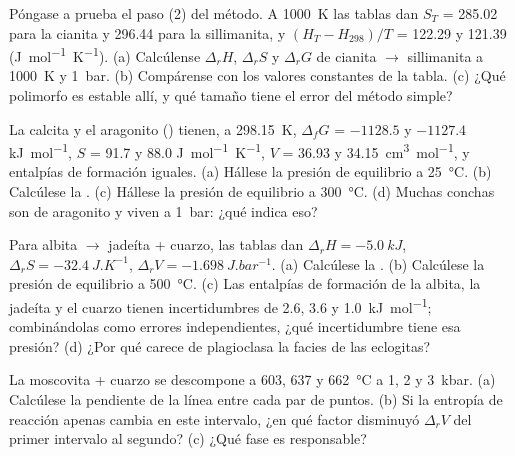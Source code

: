 \begin{exercise}[$\star\star$]\label{exo:b2:metamorphic-facies:6}
Póngase a prueba el paso (2) del método. A \qty{1000}{K} las tablas dan $S_T$ = 285.02 para la cianita
y 296.44 para la sillimanita, y $(H_T - H_{298})/T$ = 122.29 y 121.39
(\unit{J.mol^{-1}.K^{-1}}). (a) Calcúlense $\Delta_r H$, $\Delta_r S$ y $\Delta_r G$ de
cianita $\to$ sillimanita a \qty{1000}{K} y \qty{1}{bar}. (b) Compárense con los valores
constantes de la tabla. (c) ¿Qué polimorfo es estable allí, y qué tamaño tiene el error del
método simple?
\end{exercise}

\begin{exercise}[$\star\star$]\label{exo:b2:metamorphic-facies:7}
La calcita y el aragonito () tienen, a \qty{298.15}{K}, $\Delta_f G$ = $-1128.5$ y
$-1127.4$ \unit{kJ.mol^{-1}}, $S$ = 91.7 y 88.0 \unit{J.mol^{-1}.K^{-1}}, $V$ = 36.93
y \qty{34.15}{cm^3.mol^{-1}}, y entalpías de formación iguales. (a) Hállese la
presión de equilibrio a \qty{25}{\celsius}. (b) Calcúlese la . (c) Hállese la
presión de equilibrio a \qty{300}{\celsius}. (d) Muchas conchas son de aragonito y
viven a \qty{1}{bar}: ¿qué indica eso?
\end{exercise}

\begin{exercise}[$\star\star$]\label{exo:b2:metamorphic-facies:8}
Para albita $\to$ jadeíta + cuarzo, las tablas dan $\Delta_r H = \qty{-5.0}{kJ}$,
$\Delta_r S = \qty{-32.4}{J.K^{-1}}$, $\Delta_r V = \qty{-1.698}{J.bar^{-1}}$. (a)
Calcúlese la . (b) Calcúlese la presión de equilibrio a \qty{500}{\celsius}.
(c) Las entalpías de formación de la albita, la jadeíta y el cuarzo tienen incertidumbres de 2.6, 3.6
y \qty{1.0}{kJ.mol^{-1}}; combinándolas como errores independientes, ¿qué incertidumbre tiene esa
presión? (d) ¿Por qué carece de plagioclasa la facies de las eclogitas?
\end{exercise}

\begin{exercise}[$\star\star$]\label{exo:b2:metamorphic-facies:9}
La moscovita + cuarzo se descompone a 603, 637 y \qty{662}{\celsius} a 1, 2 y
\qty{3}{kbar}. (a) Calcúlese la pendiente de la línea entre cada par de puntos. (b) Si la
entropía de reacción apenas cambia en este intervalo, ¿en qué factor disminuyó $\Delta_r V$
del primer intervalo al segundo? (c) ¿Qué fase es responsable?
\end{exercise}

